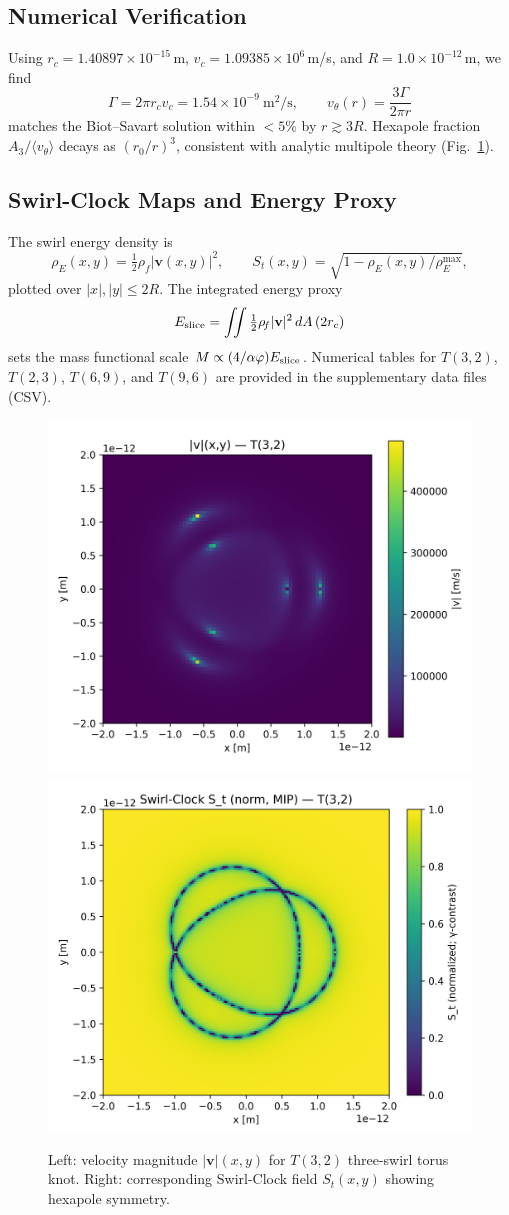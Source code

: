 \documentclass[reprint,aps,onecolumn,nofootinbib]{revtex4-2}
\begin{document}
    \subsection{Numerical Verification}
        Using $r_c=1.40897\times10^{-15}\,$m, $v_c=1.09385\times10^{6}\,$m/s, and
        $R=1.0\times10^{-12}\,$m, we find
        \[
            \Gamma=2\pi r_c v_c=1.54\times 10^{-9}\ \mathrm{m^2/s},\qquad
            v_\theta(r)=\frac{3\Gamma}{2\pi r}
        \]
        matches the Biot--Savart solution within $<5\%$ by $r\gtrsim 3R$. Hexapole fraction
        $A_3/\langle v_\theta\rangle$ decays as $(r_0/r)^3$, consistent with analytic
        multipole theory (Fig.~\ref{fig:hexapole}).

    \subsection{Swirl-Clock Maps and Energy Proxy}
        The swirl energy density is
        \[
            \rho_{\!E}(x,y)=\tfrac12 \rho_{\!f}|\mathbf{v}(x,y)|^2,
            \qquad
            S_t(x,y)=\sqrt{1-\rho_{\!E}(x,y)/\rho_{\!E}^{\max}},
        \]
        plotted over $|x|,|y|\le 2R$. The integrated energy proxy
        \[
            E_{\rm slice}=\iint \tfrac12 \rho_{\!f}|\mathbf{v}|^2\,dA\,(2r_c)
        \]
        sets the mass functional scale $M\propto (4/\alpha\varphi) E_{\rm slice}$.
        Numerical tables for $T(3,2)$, $T(2,3)$, $T(6,9)$, and $T(9,6)$ are provided
        in the supplementary data files (CSV).

        \begin{figure}[h!]
        \centering
        \includegraphics[width=0.48\linewidth]{figures/T3_2_velmag_heatmap}\hfill
        \includegraphics[width=0.48\linewidth]{figures/T3_2_SwirlClock_norm_MIP}
        \caption{Left: velocity magnitude $|\mathbf{v}|(x,y)$ for $T(3,2)$ three-swirl torus knot.
        Right: corresponding Swirl-Clock field $S_t(x,y)$ showing hexapole symmetry.}
        \label{fig:hexapole}
        \end{figure}
\end{document}
